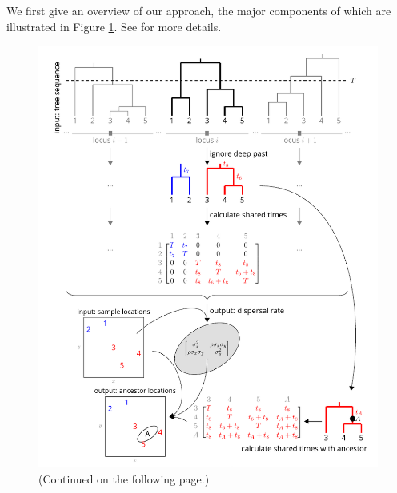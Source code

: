 \documentclass[12pt]{article}
\begin{document}
We first give an overview of our approach, the major components of which are illustrated in Figure \ref{fig:overview}. See  for more details.


\begin{figure}[!htb]
\begin{center}
\includegraphics[width=0.925\linewidth]{fig1.pdf}
\end{center}
\caption{
(Continued on the following page.)
}
\label{fig:overview}
\end{figure}
\end{document}
